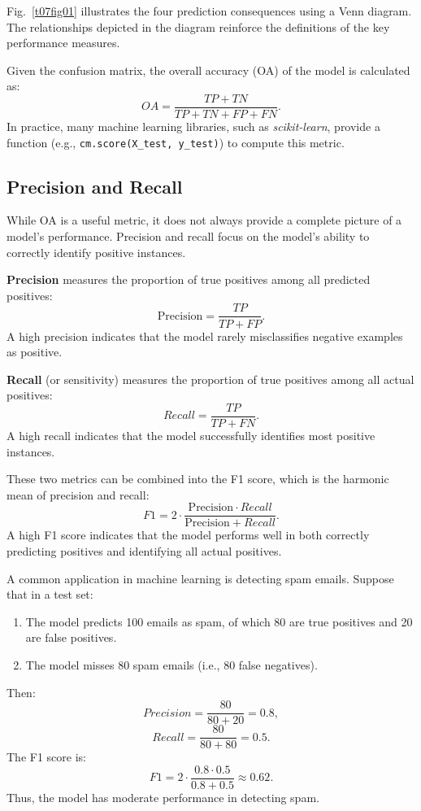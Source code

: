 \documentclass[12pt]{article}
\begin{document}
Fig.~\ref{t07fig01} illustrates the four prediction consequences using a Venn diagram. The relationships depicted in the diagram reinforce the definitions of the key performance measures.

Given the confusion matrix, the overall accuracy (OA) of the model is calculated as:
\begin{equation}
OA = \frac{TP + TN}{TP + TN + FP + FN}.
\end{equation}
In practice, many machine learning libraries, such as \textit{scikit-learn}, provide a function (e.g., \verb|cm.score(X_test, y_test)|) to compute this metric.

\subsection{Precision and Recall}
While OA is a useful metric, it does not always provide a complete picture of a model's performance. Precision and recall focus on the model's ability to correctly identify positive instances.

\textbf{Precision} measures the proportion of true positives among all predicted positives:
\[
\text{Precision} = \frac{TP}{TP + FP}.
\]
A high precision indicates that the model rarely misclassifies negative examples as positive.

\textbf{Recall} (or sensitivity) measures the proportion of true positives among all actual positives:
\[
Recall = \frac{TP}{TP + FN}.
\]
A high recall indicates that the model successfully identifies most positive instances.

These two metrics can be combined into the F1 score, which is the harmonic mean of precision and recall:
\begin{equation}
F1 = 2 \cdot \frac{\text{Precision} \cdot Recall}{\text{Precision} + Recall}.
\end{equation}
A high F1 score indicates that the model performs well in both correctly predicting positives and identifying all actual positives.

\begin{tcolorbox}

A common application in machine learning is detecting spam emails. Suppose that in a test set:
\begin{enumerate}
    \item The model predicts 100 emails as spam, of which 80 are true positives and 20 are false positives.
    \item The model misses 80 spam emails (i.e., 80 false negatives).
\end{enumerate}
Then:
\[
Precision = \frac{80}{80+20} = 0.8,
\]
\[
Recall = \frac{80}{80+80} = 0.5.
\]
The F1 score is:
\[
F1 = 2 \cdot \frac{0.8 \cdot 0.5}{0.8 + 0.5} \approx 0.62.
\]
Thus, the model has moderate performance in detecting spam.
\end{tcolorbox}
\end{document}
